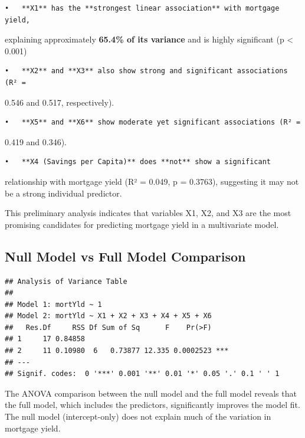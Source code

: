 \documentclass[
  11pt,
]{article}
\begin{document}
\begin{verbatim}
•   **X1** has the **strongest linear association** with mortgage yield,
\end{verbatim}

explaining approximately \textbf{65.4\% of its variance} and is highly
significant (p \textless{} 0.001)

\begin{verbatim}
•   **X2** and **X3** also show strong and significant associations (R² =
\end{verbatim}

0.546 and 0.517, respectively).

\begin{verbatim}
•   **X5** and **X6** show moderate yet significant associations (R² =
\end{verbatim}

0.419 and 0.346).

\begin{verbatim}
•   **X4 (Savings per Capita)** does **not** show a significant
\end{verbatim}

relationship with mortgage yield (R² = 0.049, p = 0.3763), suggesting it
may not be a strong individual predictor.

This preliminary analysis indicates that variables X1, X2, and X3 are
the most promising candidates for predicting mortgage yield in a
multivariate model.

\subsection{Null Model vs Full Model
Comparison}\label{null-model-vs-full-model-comparison}

\begin{verbatim}
## Analysis of Variance Table
## 
## Model 1: mortYld ~ 1
## Model 2: mortYld ~ X1 + X2 + X3 + X4 + X5 + X6
##   Res.Df     RSS Df Sum of Sq      F    Pr(>F)    
## 1     17 0.84858                                  
## 2     11 0.10980  6   0.73877 12.335 0.0002523 ***
## ---
## Signif. codes:  0 '***' 0.001 '**' 0.01 '*' 0.05 '.' 0.1 ' ' 1
\end{verbatim}

The ANOVA comparison between the null model and the full model reveals
that the full model, which includes the predictors, significantly
improves the model fit. The null model (intercept-only) does not explain
much of the variation in mortgage yield.
\end{document}
